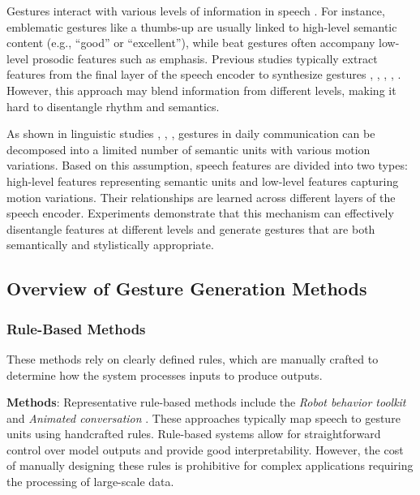 Gestures interact with various levels of information in speech \cite{sebeok2011advances}. For instance, emblematic gestures like a thumbs-up are usually linked to high-level semantic content (e.g., “good” or “excellent”), while beat gestures often accompany low-level prosodic features such as emphasis. Previous studies typically extract features from the final layer of the speech encoder to synthesize gestures \cite{alexanderson2020style}, \cite{bhattacharya2021speech2affectivegestures}, \cite{kucherenko2021large}, \cite{qian2021speech}, \cite{yoon2022genea}. However, this approach may blend information from different levels, making it hard to disentangle rhythm and semantics.

As shown in linguistic studies \cite{kipp2005gesture}, \cite{neff2008gesture}, \cite{webb1997linguistic}, gestures in daily communication can be decomposed into a limited number of semantic units with various motion variations. Based on this assumption, speech features are divided into two types: high-level features representing semantic units and low-level features capturing motion variations. Their relationships are learned across different layers of the speech encoder. Experiments demonstrate that this mechanism can effectively disentangle features at different levels and generate gestures that are both semantically and stylistically appropriate.





\subsection{Overview of Gesture Generation Methods}
\label{sec:relatedwork}

\subsubsection{Rule-Based Methods}

These methods rely on clearly defined rules, which are manually crafted to determine how the system processes inputs to produce outputs.

\textbf{Methods}: Representative rule-based methods include the \textit{Robot behavior toolkit} \cite{huang2012robot} and \textit{Animated conversation} \cite{cassell1994animated}. These approaches typically map speech to gesture units using handcrafted rules. Rule-based systems allow for straightforward control over model outputs and provide good interpretability.  
However, the cost of manually designing these rules is prohibitive for complex applications requiring the processing of large-scale data.


